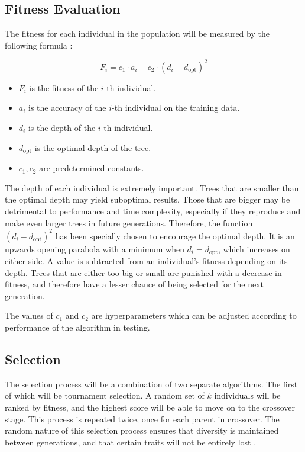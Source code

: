 \documentclass[12pt]{article}
\begin{document}
\subsection{Fitness Evaluation}

The fitness for each individual in the population will be measured by the following formula \cite{faik_2020}:

\[ F_i = c_1 \cdot a_i - c_2 \cdot (d_i - d_\text{opt})^2 \]

\begin{itemize}
    \item $F_i$ is the fitness of the $i$-th individual.
    \item $a_i$ is the accuracy of the $i$-th individual on the training data.
    \item $d_i$ is the depth of the $i$-th individual.
    \item $d_\text{opt}$ is the optimal depth of the tree.
    \item $c_1, c_2$ are predetermined constants.
\end{itemize}

The depth of each individual is extremely important. Trees that are smaller than the optimal depth may yield suboptimal results. Those that are bigger may be detrimental to performance and time complexity, especially if they reproduce and make even larger trees in future generations. Therefore, the function $(d_i - d_\text{opt})^2$ has been specially chosen to encourage the optimal depth. It is an upwards opening parabola with a minimum when $d_i = d_\text{opt}$, which increases on either side. A value is subtracted from an individual's fitness depending on its depth. Trees that are either too big or small are punished with a decrease in fitness, and therefore have a lesser chance of being selected for the next generation.

The values of $c_1$ and $c_2$ are hyperparameters which can be adjusted according to performance of the algorithm in testing.

\subsection{Selection}

The selection process will be a combination of two separate algorithms. The first of which will be tournament selection. A random set of $k$ individuals will be ranked by fitness, and the highest score will be able to move on to the crossover stage. This process is repeated twice, once for each parent in crossover. The random nature of this selection process ensures that diversity is maintained between generations, and that certain traits will not be entirely lost \cite{blickle_1997}.
\end{document}
